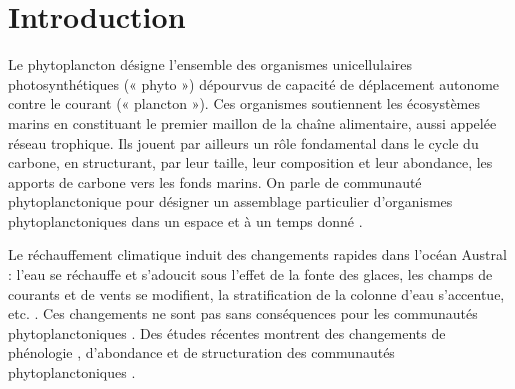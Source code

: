 \chapter{Introduction}

Le phytoplancton désigne l'ensemble des organismes unicellulaires photosynthétiques (« phyto ») dépourvus de capacité de déplacement autonome contre le courant (« plancton »). Ces organismes soutiennent les écosystèmes marins en constituant le premier maillon de la chaîne alimentaire, aussi appelée réseau trophique. Ils jouent par ailleurs un rôle fondamental dans le cycle du carbone, en structurant, par leur taille, leur composition et leur abondance, les apports de carbone vers les fonds marins. On parle de communauté phytoplanctonique pour désigner un assemblage particulier d'organismes phytoplanctoniques dans un espace et à un temps donné \cite{reynolds2006ecology}.

\vspace{0.3cm}

Le réchauffement climatique induit des changements rapides dans l'océan Austral : l'eau se réchauffe et s'adoucit sous l'effet de la fonte des glaces, les champs de courants et de vents se modifient, la stratification de la colonne d'eau s'accentue, etc. \cite{sallee2018} \cite{abram2025Antarctic}. Ces changements ne sont pas sans conséquences pour les communautés phytoplanctoniques \cite{deppeler2017southern}. Des études récentes montrent des changements de phénologie \cite{thomalla2023Widespread}\cite{boyce2017environmental}, d'abondance \cite{hayward2024Antarctic} et de structuration des communautés phytoplanctoniques \cite{adroli2026}.

\vspace{0.3cm}

